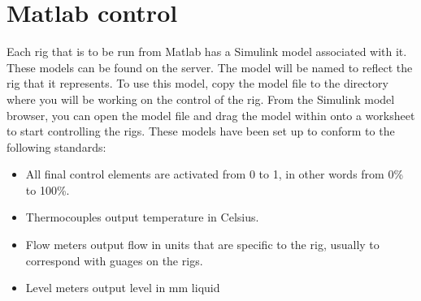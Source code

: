\section{Matlab control}
Each rig that is to be run from Matlab has a Simulink model associated with it.  These models can be found on the server.  The model will be named to reflect the rig that it represents.  To use this model, copy the model file to the directory where you will be working on the control of the rig.  From the Simulink model browser, you can open the model file and drag the model within onto a worksheet to start controlling the rigs.  These models have been set up to conform to the following standards:
\begin{itemize}
	\item All final control elements are activated from 0 to 1, in other words from 0\% to 100\%.  
	\item Thermocouples output temperature in \deg Celsius.
	\item Flow meters output flow in units that are specific to the rig, usually to correspond with guages on the rigs.
	\item Level meters output level in mm liquid
\end{itemize}





